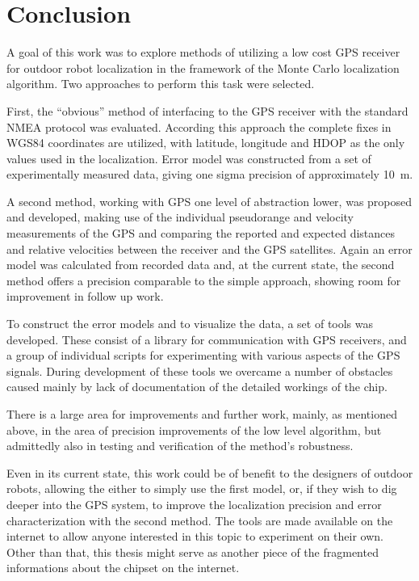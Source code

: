 \chapter{Conclusion}
\label{chap:conclusion}

A goal of this work was to explore methods of utilizing a low cost GPS receiver
for outdoor robot localization in the framework of the Monte Carlo localization algorithm.
Two approaches to perform this task were selected.

First, the \enquote{obvious} method of interfacing to the GPS receiver with the
standard NMEA protocol was evaluated.
According this approach the complete fixes in WGS84 coordinates are utilized,
with latitude, longitude and HDOP as the only values used in the localization.
Error model was constructed from a set of experimentally measured data,
giving one sigma precision of approximately \SI{10}{\meter}.

A second method, working with GPS one level of abstraction lower, was proposed and developed,
making use of the individual pseudorange and velocity measurements
of the GPS and comparing the reported and expected distances and relative velocities
between the receiver and the GPS satellites.
Again an error model was calculated from recorded data and,
at the current state, the second method offers a precision comparable to the simple
approach, showing room for improvement in follow up work.

To construct the error models and to visualize the data, a set of tools was developed.
These consist of a library for communication with \sirf GPS receivers,
and a group of individual scripts for experimenting with various aspects of the GPS signals.
During development of these tools we overcame a number of obstacles caused mainly
by lack of documentation of the detailed workings of the \sirf chip.

There is a large area for improvements and further work, mainly, as mentioned
above, in the area of precision improvements of the low level algorithm,
but admittedly also in testing and verification of the method's robustness.

Even in its current state, this work could be of benefit to the designers of
outdoor robots, allowing the either to simply use the first model, or, if they
wish to dig deeper into the GPS system, to improve the localization precision
and error characterization with the second method.
The tools are made available on the internet to allow anyone interested in this
topic to experiment on their own.
Other than that, this thesis might serve as another piece of the fragmented
informations about the \sirf chipset on the internet.
